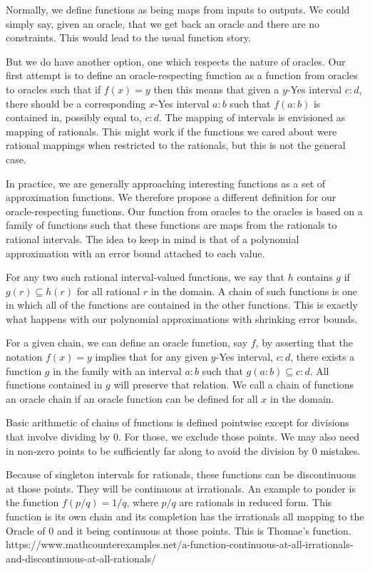 \documentclass[12pt]{article}
\theoremstyle{remark}
\begin{document}
Normally, we define functions as being maps from inputs to outputs. We could simply say, given an oracle, that we get back an oracle and there are no constraints. This would lead to the usual function story. 

But we do have another option, one which respects the nature of oracles. Our first attempt is to define an oracle-respecting function as a function from oracles to oracles such that if $f(x) = y$ then this means that given a $y$-Yes interval $c:d$, there should be a corresponding $x$-Yes interval $a:b$ such that $f(a:b)$ is contained in, possibly equal to, $c:d$. The mapping of intervals is envisioned as mapping of rationals. This might work if the functions we cared about were rational mappings when restricted to the rationals, but this is not the general case. 

In practice, we are generally approaching interesting functions as a set of approximation functions. We therefore propose a different definition for our oracle-respecting functions. Our function from oracles to the oracles is based on a family of functions such that these functions are maps from the rationals to rational intervals. The idea to keep in mind is that of a polynomial approximation with an error bound attached to each value. 

For any two such rational interval-valued functions, we say that $h$ contains $g$ if $g(r) \subseteq h(r)$ for all rational $r$ in the domain. A chain of such functions is one in which all of the functions are contained in the other functions. This is exactly what happens with our polynomial approximations with shrinking error bounds.

For a given chain, we can define an oracle function, say $f$, by asserting that the notation $f(x) = y$ implies that for any given $y$-Yes interval, $c:d$, there exists a function $g$ in the family with an interval $a:b$ such that $g(a:b) \subseteq c:d$. All functions contained in $g$ will preserve that relation. We call a chain of functions an oracle chain if an oracle function can be defined for all $x$ in the domain.

Basic arithmetic of chains of functions is defined pointwise except for divisions that involve dividing by 0. For those, we exclude those points. We may also need in non-zero points to be sufficiently far along to avoid the division by 0 mistakes. 

Because of singleton intervals for rationals, these functions can be discontinuous at those points. They will be continuous at irrationals. An example to ponder is the function $f(p/q) = 1/q$, where $p/q$ are rationals in reduced form. This function is its own chain and its completion has the irrationals all mapping to the Oracle of 0 and it being continuous at those points. This is Thomae's function. https://www.mathcounterexamples.net/a-function-continuous-at-all-irrationals-and-discontinuous-at-all-rationals/
\end{document}
